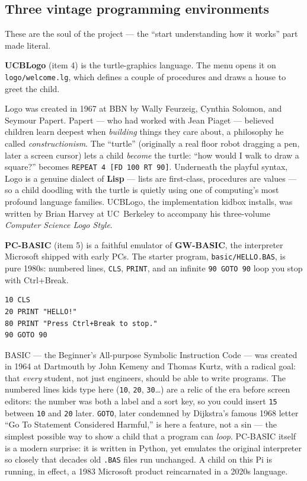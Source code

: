 \documentclass[11pt,oneside]{article}
\newcommand{\code}[1]{\texorpdfstring{\textcolor{kbblue}{\texttt{#1}}}{#1}}
\newcommand{\file}[1]{\textcolor{kbteal}{\texttt{#1}}}
\begin{document}
\subsection{Three vintage programming environments}

These are the soul of the project --- the ``start understanding how it works''
part made literal.

\textbf{UCBLogo} (item 4) is the turtle-graphics language. The menu opens it on
\file{logo/welcome.lg}, which defines a couple of procedures and draws a house
to greet the child.

\begin{deeper}
Logo was created in 1967 at BBN by Wally Feurzeig, Cynthia Solomon, and Seymour
Papert. Papert --- who had worked with Jean Piaget --- believed children learn
deepest when \emph{building} things they care about, a philosophy he called
\emph{constructionism}. The ``turtle'' (originally a real floor robot dragging a
pen, later a screen cursor) lets a child \emph{become} the turtle: ``how would I
walk to draw a square?'' becomes \code{REPEAT 4 [FD 100 RT 90]}. Underneath the
playful syntax, Logo is a genuine dialect of \textbf{Lisp} --- lists are
first-class, procedures are values --- so a child doodling with the turtle is
quietly using one of computing's most profound language families. UCBLogo, the
implementation kidbox installs, was written by Brian Harvey at UC~Berkeley to
accompany his three-volume \emph{Computer Science Logo Style}.
\end{deeper}

\textbf{PC-BASIC} (item 5) is a faithful emulator of \textbf{GW-BASIC}, the
interpreter Microsoft shipped with early PCs. The starter program,
\file{basic/HELLO.BAS}, is pure 1980s: numbered lines, \code{CLS}, \code{PRINT},
and an infinite \code{90 GOTO 90} loop you stop with Ctrl+Break.

\begin{lstlisting}
10 CLS
20 PRINT "HELLO!"
80 PRINT "Press Ctrl+Break to stop."
90 GOTO 90
\end{lstlisting}

\begin{deeper}
BASIC --- the Beginner's All-purpose Symbolic Instruction Code --- was created in
1964 at Dartmouth by John Kemeny and Thomas Kurtz, with a radical goal: that
\emph{every} student, not just engineers, should be able to write programs. The
numbered lines kids type here (\code{10}, \code{20}, \code{30}\dots) are a relic
of the era before screen editors: the number was both a label and a sort key, so
you could insert \code{15} between \code{10} and \code{20} later. \code{GOTO},
later condemned by Dijkstra's famous 1968 letter ``Go To Statement Considered
Harmful,'' is here a feature, not a sin --- the simplest possible way to show a
child that a program can \emph{loop}. PC-BASIC itself is a modern surprise: it is
written in Python, yet emulates the original interpreter so closely that decades
old \texttt{.BAS} files run unchanged. A child on this Pi is running, in effect,
a 1983 Microsoft product reincarnated in a 2020s language.
\end{deeper}
\end{document}
